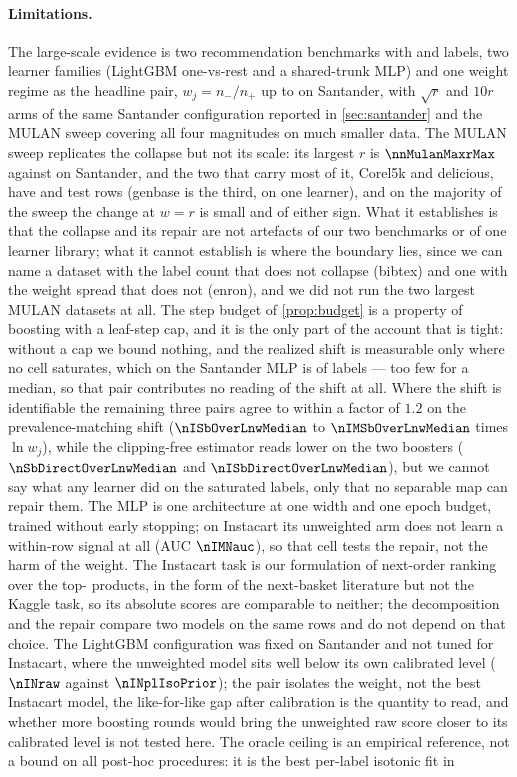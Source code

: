 \documentclass[sigconf,nonacm]{acmart}
\begin{document}
\paragraph{Limitations.} The large-scale evidence is two recommendation benchmarks with \nnLabels{} and \nInLabels{} labels, two learner families (LightGBM one-vs-rest and a shared-trunk MLP) and one weight regime as the headline pair, $w_j=n_-/n_+$ up to \nwMax{} on Santander, with $\sqrt{r}$ and $10r$ arms of the same Santander configuration reported in \cref{sec:santander} and the MULAN sweep covering all four magnitudes on much smaller data. The MULAN sweep replicates the collapse but not its scale: its largest $r$ is $\nnMulanMaxrMax$ against \nwMax{} on Santander, and the two that carry most of it, Corel5k and delicious, have \ncorelNtestDose{} and \ndelNtestDose{} test rows (genbase is the third, on one learner), and on the majority of the sweep the change at $w{=}r$ is small and of either sign. What it establishes is that the collapse and its repair are not artefacts of our two benchmarks or of one learner library; what it cannot establish is where the boundary lies, since we can name a dataset with the label count that does not collapse (bibtex) and one with the weight spread that does not (enron), and we did not run the two largest MULAN datasets at all. The step budget of \cref{prop:budget} is a property of boosting with a leaf-step cap, and it is the only part of the account that is tight: without a cap we bound nothing, and the realized shift is measurable only where no cell saturates, which on the Santander MLP is \nMSnIdentShift{} of \nnLabels{} labels --- too few for a median, so that pair contributes no reading of the shift at all. Where the shift is identifiable the remaining three pairs agree to within a factor of $1.2$ on the prevalence-matching shift ($\nISbOverLnwMedian$ to $\nIMSbOverLnwMedian$ times $\ln w_j$), while the clipping-free estimator reads lower on the two boosters ($\nSbDirectOverLnwMedian$ and $\nISbDirectOverLnwMedian$), but we cannot say what any learner did on the saturated labels, only that no separable map can repair them. The MLP is one architecture at one width and one epoch budget, trained without early stopping; on Instacart its unweighted arm does not learn a within-row signal at all (AUC $\nIMNauc$), so that cell tests the repair, not the harm of the weight. The Instacart task is our formulation of next-order ranking over the top-\nInLabels{} products, in the form of the next-basket literature but not the Kaggle task, so its absolute scores are comparable to neither; the decomposition and the repair compare two models on the same rows and do not depend on that choice. The LightGBM configuration was fixed on Santander and not tuned for Instacart, where the unweighted model sits well below its own calibrated level ($\nINraw$ against $\nINplIsoPrior$); the pair isolates the weight, not the best Instacart model, the like-for-like gap after calibration is the quantity to read, and whether more boosting rounds would bring the unweighted raw score closer to its calibrated level is not tested here. The oracle ceiling is an empirical reference, not a bound on all post-hoc procedures: it is the best per-label isotonic fit in 
\end{document}
